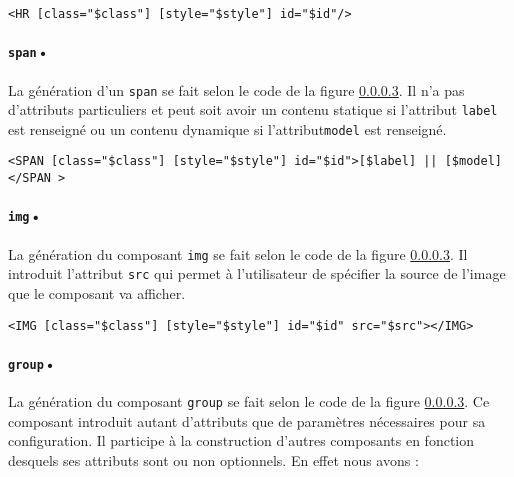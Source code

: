 \documentclass[a4paper,11pt]{report}
\begin{document}
\begin{verbatim}
<HR [class="$class"] [style="$style"] id="$id"/>
\end{verbatim}

\paragraph{{\tt span}•} La génération d'un {\tt span} se fait selon le code de la figure \ref{}. Il n'a pas d'attributs particuliers et peut soit
avoir un contenu statique si l'attribut {\tt label} est renseigné ou un contenu dynamique si l'attribut{\tt model} est renseigné.

\begin{verbatim}
<SPAN [class="$class"] [style="$style"] id="$id">[$label] || [$model]</SPAN	>
\end{verbatim}

\paragraph{{\tt img}•} La génération du composant {\tt img} se fait selon le code de la figure \ref{}. Il introduit l'attribut {\tt src} qui permet
à l'utilisateur de spécifier la source de l'image que le composant va afficher.

\begin{verbatim}
<IMG [class="$class"] [style="$style"] id="$id" src="$src"></IMG>
\end{verbatim}

\paragraph{{\tt group}• }La génération du composant {\tt group} se fait selon le code de la figure \ref{}. Ce composant introduit autant d'attributs
que de paramètres nécessaires pour sa configuration. Il participe à la construction d'autres composants en fonction desquels 
ses attributs sont ou non  optionnels. En effet nous avons :
\end{document}
